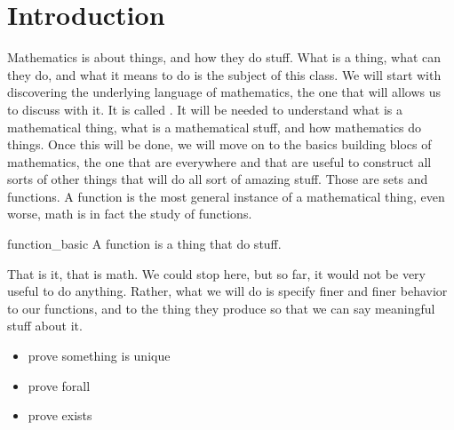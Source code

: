 \section{Introduction}

Mathematics is about things, and how they do stuff. What is a thing, what can they do, and what it means to do is the subject of this class. We will start with discovering the underlying language of mathematics, the one that will allows us to discuss with it. It is called . It will be needed to understand what is a mathematical thing, what is a mathematical stuff, and how mathematics do things. Once this will be done, we will move on to the basics building blocs of mathematics, the one that are everywhere and that are useful to construct all sorts of other things that will do all sort of amazing stuff. Those are sets and functions. A function is the most general instance of a mathematical thing, even worse, math is in fact the study of functions. 

\begin{cdef}{}{function_basic}
    A function is a thing that do stuff.
\end{cdef}

That is it, that is math. We could stop here, but so far, it would not be very useful to do anything. Rather, what we will do is specify finer and finer behavior to our functions, and to the thing they produce so that we can say meaningful stuff about it.

\begin{itemize}
    \item prove something is unique
    \item prove forall
    \item prove exists
\end{itemize}
